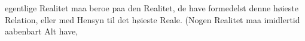 \documentclass[12pt]{book}
\def\textit#1{#1}%
\def\\{ }%
\newcommand{\rubrik}[2]{%
  \par\vspace{1.1\baselineskip}%
  \begin{center}
    {\large\textit{#1}\par}\vspace{0.35\baselineskip}
    {#2\par}
  \end{center}
  \vspace{0.5\baselineskip}
  \phantomsection
  \addcontentsline{toc}{section}{\texorpdfstring{#1\ #2}{#1 #2}}%
}
\newcommand{\ovrubrik}[2]{%
  \par\vspace{0.9\baselineskip}%
  \begin{center}{\textit{#1}\par}\vspace{0.25\baselineskip}{#2\par}\end{center}
  \vspace{0.4\baselineskip}}
\begin{document}
egentlige Realitet maa beroe paa den Realitet, de have formedelst denne høieste
Relation, eller med Hensyn til det høieste Reale. (Nogen Realitet maa imidlertid
aabenbart Alt have,
%
%
%
%
%
%
\end{document}
